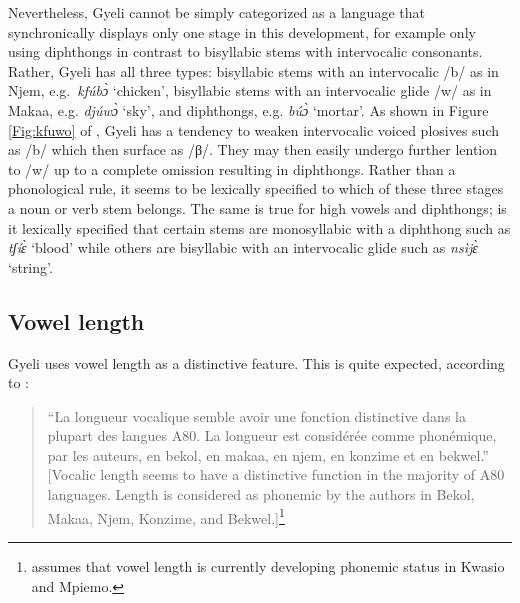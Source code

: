 Nevertheless, Gyeli cannot be simply categorized as a language that synchronically displays only one stage in this development, for example only using diphthongs in contrast to bisyllabic stems with intervocalic consonants. Rather, Gyeli has all three types: bisyllabic stems with an intervocalic /b/ as in Njem, e.g.\ {\itshape kfúbɔ̀} `chicken', bisyllabic stems with an intervocalic glide /w/ as in Makaa, e.g. {\itshape djúwɔ̀} `sky', and diphthongs, e.g. {\itshape búɔ̀} `mortar'. As shown in Figure \ref{Fig:kfuwo} of , Gyeli has a tendency to weaken intervocalic voiced plosives such as /b/ which then surface as /β/.  They may then easily undergo further lention to /w/ up to a complete omission resulting in diphthongs. Rather than a phonological rule, it seems to be lexically specified to which of these three stages a noun or verb stem belongs. The same is true for high vowels and diphthongs; is it lexically specified that certain stems are monosyllabic with a diphthong such as {\itshape tʃíɛ̀} `blood' while others are bisyllabic with an intervocalic glide such as {\itshape nsìjɛ̀} `string'. 




\subsection{Vowel length}
\label {sec:VLength}

Gyeli uses vowel length as a distinctive feature. This is quite expected, according to \citet[327]{cheucle2014}:
\begin{quote} 
``La longueur vocalique semble avoir une fonction distinctive dans la plupart des langues A80. La longueur est considérée comme phonémique, par les auteurs, en bekol, en makaa, en njem, en konzime et en bekwel.'' [Vocalic length seems to have a distinctive function in the majority of A80 languages. Length is considered as phonemic by the authors in Bekol, Makaa, Njem, Konzime, and Bekwel.]\footnote{\citet[327]{cheucle2014} assumes that vowel length is currently developing phonemic status in Kwasio and Mpiemo.}
\end{quote}

